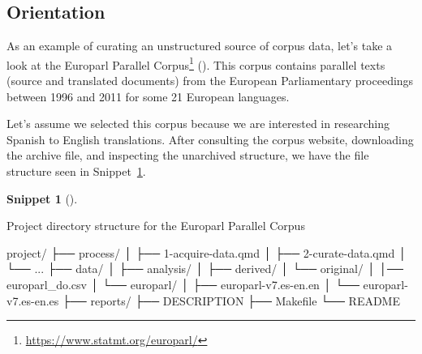 \documentclass[
  letterpaper,
  krantz1]{latex/krantz-mod}
\newenvironment{Shaded}{\begin{snugshade}}{\end{snugshade}}
\newcommand{\ExtensionTok}[1]{\textcolor[rgb]{0.00,0.00,0.00}{#1}}
\newcommand{\NormalTok}[1]{\textcolor[rgb]{0.00,0.00,0.00}{#1}}
\theoremstyle{definition}
\newtheorem{definition}{Snippet}[chapter]
\theoremstyle{definition}
\theoremstyle{remark}
\DeclareRobustCommand{\href}[2]{#2\footnote{\url{#1}}}
\begin{document}
\subsection{Orientation}\label{orientation}

As an example of curating an unstructured source of corpus data, let's
take a look at the \href{https://www.statmt.org/europarl/}{Europarl
Parallel Corpus} (). This corpus contains parallel
texts (source and translated documents) from the European Parliamentary
proceedings between 1996 and 2011 for some 21 European
languages.

Let's assume we selected this corpus because we are interested in
researching Spanish to English translations. After consulting the corpus
website, downloading the archive file, and inspecting the unarchived
structure, we have the file structure seen in
Snippet~\ref{def-curate-europarl-file-structure}.

\begin{definition}[]\protect\hypertarget{def-curate-europarl-file-structure}{}\label{def-curate-europarl-file-structure}

Project directory structure for the Europarl Parallel Corpus

\begin{Shaded}
\begin{Highlighting}[]
\ExtensionTok{project/}
\ExtensionTok{├──}\NormalTok{ process/}
\ExtensionTok{│}\NormalTok{   ├── 1{-}acquire{-}data.qmd}
\ExtensionTok{│}\NormalTok{   ├── 2{-}curate{-}data.qmd}
\ExtensionTok{│}\NormalTok{   └── ...}
\ExtensionTok{├──}\NormalTok{ data/}
\ExtensionTok{│}\NormalTok{   ├── analysis/}
\ExtensionTok{│}\NormalTok{   ├── derived/}
\ExtensionTok{│}\NormalTok{   └── original/}
\ExtensionTok{│}\NormalTok{       │── europarl\_do.csv}
\ExtensionTok{│}\NormalTok{       └── europarl/}
\ExtensionTok{│}\NormalTok{           ├── europarl{-}v7.es{-}en.en}
\ExtensionTok{│}\NormalTok{           └── europarl{-}v7.es{-}en.es}
\ExtensionTok{├──}\NormalTok{ reports/}
\ExtensionTok{├──}\NormalTok{ DESCRIPTION}
\ExtensionTok{├──}\NormalTok{ Makefile}
\ExtensionTok{└──}\NormalTok{ README}
\end{Highlighting}
\end{Shaded}


\end{definition}
\end{document}
